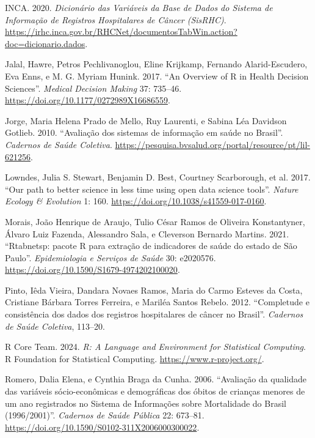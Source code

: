 \documentclass[
  brazilian,
  a4paper,
  oneside]{scrbook}
\newlength{\cslhangindent}
\newenvironment{CSLReferences}[2] %
 {\begin{list}{}{%
  \setlength{\itemindent}{0pt}
  \setlength{\leftmargin}{0pt}
  \setlength{\parsep}{0pt}
  \ifodd #1
   \setlength{\leftmargin}{\cslhangindent}
   \setlength{\itemindent}{-1\cslhangindent}
  \fi
  \setlength{\itemsep}{#2\baselineskip}}}
 {\end{list}}
\begin{document}
\begin{CSLReferences}{1}{1}
INCA. 2020. \emph{Dicionário das Variáveis da Base de Dados do Sistema
de Informação de Registros Hospitalares de Câncer ({SisRHC})}.
\url{https://irhc.inca.gov.br/RHCNet/documentosTabWin.action?doc=dicionario.dados}.

Jalal, Hawre, Petros Pechlivanoglou, Eline Krijkamp, Fernando
Alarid-Escudero, Eva Enns, e M. G. Myriam Hunink. 2017. {``An Overview
of {R} in Health Decision Sciences''}. \emph{Medical Decision Making}
37: 735--46. \url{https://doi.org/10.1177/0272989X16686559}.

Jorge, Maria Helena Prado de Mello, Ruy Laurenti, e Sabina Léa Davidson
Gotlieb. 2010. {``Avaliação dos sistemas de informação em saúde no
Brasil''}. \emph{Cadernos de Saúde Coletiva}.
\url{https://pesquisa.bvsalud.org/portal/resource/pt/lil-621256}.

{Lowndes, Julia S. Stewart, Benjamin D. Best, Courtney Scarborough, et
al.} 2017. {``Our path to better science in less time using open data
science tools''}. \emph{Nature Ecology \& Evolution} 1: 160.
\url{https://doi.org/10.1038/s41559-017-0160}.

Morais, João Henrique de Araujo, Tulio César Ramos de Oliveira
Konstantyner, Álvaro Luiz Fazenda, Alessandro Sala, e Cleverson Bernardo
Martins. 2021. {``Rtabnetsp: pacote {R} para extração de indicadores de
saúde do estado de {São Paulo}''}. \emph{Epidemiologia e Serviços de
Saúde} 30: e2020576. \url{https://doi.org/10.1590/S1679-4974202100020}.

Pinto, Iêda Vieira, Dandara Novaes Ramos, Maria do Carmo Esteves da
Costa, Cristiane Bárbara Torres Ferreira, e Mariléa Santos Rebelo. 2012.
{``Completude e consistência dos dados dos registros hospitalares de
câncer no Brasil''}. \emph{Cadernos de Saúde Coletiva}, 113--20.

R Core Team. 2024. \emph{R: A Language and Environment for Statistical
Computing}. R Foundation for Statistical Computing.
\url{https://www.r-project.org/}.

Romero, Dalia Elena, e Cynthia Braga da Cunha. 2006. {``Avaliação da
qualidade das variáveis sócio-econômicas e demográficas dos óbitos de
crianças menores de um ano registrados no Sistema de Informações sobre
Mortalidade do Brasil (1996/2001)''}. \emph{Cadernos de Saúde Pública}
22: 673--81. \url{https://doi.org/10.1590/S0102-311X2006000300022}.


\end{CSLReferences}
\end{document}
